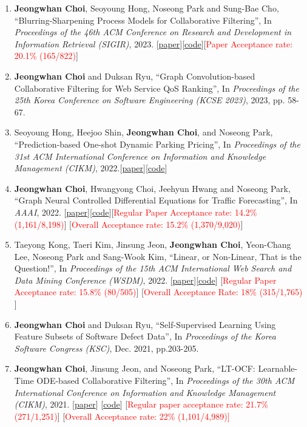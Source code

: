 \documentclass[10pt]{article}
\newenvironment{changemargin}[2]{
  \begin{list}{}{
    \setlength{\topsep}{0pt}
    \setlength{\leftmargin}{#1}
    \setlength{\rightmargin}{#2}
    \setlength{\listparindent}{\parindent}
    \setlength{\itemindent}{\parindent}
    \setlength{\parsep}{\parskip}
  }
  \item[]}{\end{list}
}
\newcommand{\RED}[1]{\textcolor{red}{#1}}
\newenvironment{body} {
	\vspace*{-16pt}
	\begin{changemargin}{-0.25in}{-0.5in}
  }
	{\end{changemargin}
}
\begin{document}
\begin{body}
\begin{enumerate}
    \item \textbf{Jeongwhan Choi}, Seoyoung Hong, Noseong Park and Sung-Bae Cho, ``Blurring-Sharpening Process Models for Collaborative Filtering'', In \emph{Proceedings of the 46th ACM Conference on Research and Development in Information Retrieval (SIGIR)}, 2023. [\href{https://arxiv.org/abs/2211.09324}{paper}][\href{https://github.com/jeongwhanchoi/bspm}{code}][\RED{Paper Acceptance rate: 20.1\% (165/822)}]
    \item \textbf{Jeongwhan Choi} and Duksan Ryu, ``Graph Convolution-based Collaborative Filtering for Web Service QoS Ranking'', In \emph{Proceedings of the 25th Korea Conference on Software Engineering (KCSE 2023)}, 2023, pp. 58-67.
    \item Seoyoung Hong, Heejoo Shin, \textbf{Jeongwhan Choi}, and Noseong Park, ``Prediction-based One-shot Dynamic Parking Pricing'', In \emph{Proceedings of the 31st ACM International Conference on Information and Knowledge Management (CIKM)}, 2022.[\href{https://arxiv.org/abs/2208.14231}{paper}][\href{https://github.com/jeongwhanchoi/one-shot-optimization}{code}]
    \item \textbf{Jeongwhan Choi}, Hwangyong Choi, Jeehyun Hwang and Noseong Park, ``Graph Neural Controlled Differential Equations for Traffic Forecasting'', In \emph{AAAI}, 2022. [\href{https://ojs.aaai.org/index.php/AAAI/article/download/20587/20346}{paper}][\href{https://github.com/jeongwhanchoi/STG-NCDE}{code}][\RED{Regular Paper Acceptance rate: 14.2\% (1,161/8,198)}] [\RED{Overall Acceptance rate: 15.2\% (1,370/9,020)}]
    \item Taeyong Kong, Taeri Kim, Jinsung Jeon, \textbf{Jeongwhan Choi}, Yeon-Chang Lee, Noseong Park and Sang-Wook Kim, ``Linear, or Non-Linear, That is the Question!'', In \textit{Proceedings of the 15th ACM International Web Search and Data Mining Conference (WSDM)}, 2022.  [\href{https://arxiv.org/abs/2111.07265}{paper}][\href{https://github.com/jeongwhanchoi/HMLET}{code}] [\RED{Regular Paper Acceptance rate: 15.8\% (80/505)}] [\RED{Overall Acceptance Rate: 18\%  (315/1,765)} ]
    \item \textbf{Jeongwhan Choi} and Duksan Ryu, ``Self-Supervised Learning Using Feature Subsets of Software Defect Data'',  In \emph{Proceedings of the Korea Software Congress (KSC)}, Dec. 2021, pp.203-205.
    \item \textbf{Jeongwhan Choi}, Jinsung Jeon, and Noseong Park, ``LT-OCF: Learnable-Time ODE-based Collaborative Filtering'', In \emph{Proceedings of the 30th ACM International Conference on Information and Knowledge Management (CIKM)}, 2021. [\href{https://arxiv.org/pdf/2108.06208.pdf}{paper}] [\href{https://github.com/jeongwhanchoi/LT-OCF}{code}]  [\RED{Regular paper acceptance rate: 21.7\% (271/1,251)}]  [\RED{Overall Acceptance rate: 22\% (1,101/4,989)]}

\end{enumerate}
\end{body}
\end{document}

